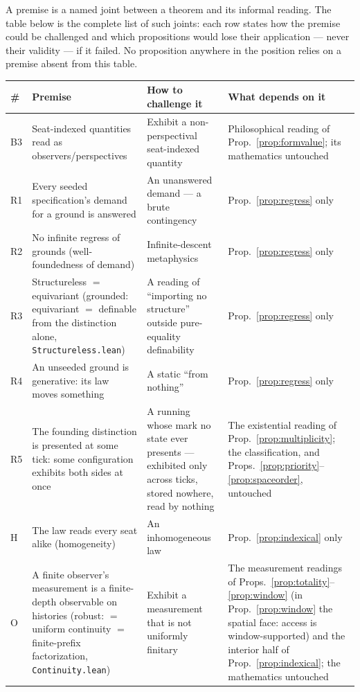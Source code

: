 \documentclass[11pt]{article}
\theoremstyle{remark}
\newcommand{\lf}[1]{\texttt{#1}}       %
\begin{document}
A premise is a named joint between a theorem and its informal reading. The table below is the complete list of such joints: each row states how the premise could be challenged and which propositions would lose their application --- never their validity --- if it failed. No proposition anywhere in the position relies on a premise absent from this table.

\begin{center}
\small
\begin{tabular}{@{}lp{}p{}p{}@{}}
\toprule
\# & \textbf{Premise} & \textbf{How to challenge it} & \textbf{What depends on it} \\
\midrule
B3 & Seat-indexed quantities read as observers/perspectives & Exhibit a non-perspectival seat-indexed quantity & Philosophical reading of Prop.~\ref{prop:formvalue}; its mathematics untouched \\
\addlinespace[2pt]
R1 & Every seeded specification's demand for a ground is answered & An unanswered demand --- a brute contingency & Prop.~\ref{prop:regress} only \\
\addlinespace[2pt]
R2 & No infinite regress of grounds (well-foundedness of demand) & Infinite-descent metaphysics & Prop.~\ref{prop:regress} only \\
\addlinespace[2pt]
R3 & Structureless $=$ equivariant (grounded: equivariant $=$ definable from the distinction alone, \lf{Structureless.lean}) & A reading of ``importing no structure'' outside pure-equality definability & Prop.~\ref{prop:regress} only \\
\addlinespace[2pt]
R4 & An unseeded ground is generative: its law moves something & A static ``from nothing'' & Prop.~\ref{prop:regress} only \\
\addlinespace[2pt]
R5 & The founding distinction is presented at some tick: some configuration exhibits both sides at once & A running whose mark no state ever presents --- exhibited only across ticks, stored nowhere, read by nothing & The existential reading of Prop.~\ref{prop:multiplicity}; the classification, and Props.~\ref{prop:priority}--\ref{prop:spaceorder}, untouched \\
\addlinespace[2pt]
H & The law reads every seat alike (homogeneity) & An inhomogeneous law & Prop.~\ref{prop:indexical} only \\
\addlinespace[2pt]
O & A finite observer's measurement is a finite-depth observable on histories (robust: $=$ uniform continuity $=$ finite-prefix factorization, \lf{Continuity.lean}) & Exhibit a measurement that is not uniformly finitary & The measurement readings of Props.~\ref{prop:totality}--\ref{prop:window} (in Prop.~\ref{prop:window} the spatial face: access is window-supported) and the interior half of Prop.~\ref{prop:indexical}; the mathematics untouched \\

\end{tabular}
\end{center}
\end{document}
